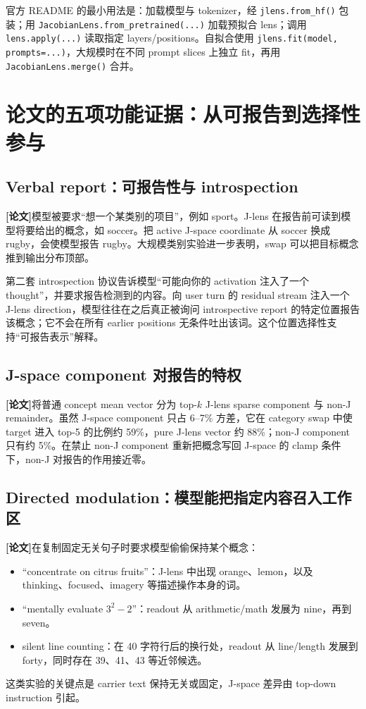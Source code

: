 \documentclass[10.5pt,a4paper]{ctexart}
\newcommand{\Paper}{\textbf{[论文]}}
\begin{document}
\begin{codeclaim}
官方 README 的最小用法是：加载模型与 tokenizer，经 \texttt{jlens.from\_hf()} 包装；用 \texttt{JacobianLens.from\_pretrained(...)} 加载预拟合 lens；调用 \texttt{lens.apply(...)} 读取指定 layers/positions。自拟合使用 \texttt{jlens.fit(model, prompts=...)}，大规模时在不同 prompt slices 上独立 fit，再用 \texttt{JacobianLens.merge()} 合并。
\end{codeclaim}

\section{论文的五项功能证据：从可报告到选择性参与}

\subsection{Verbal report：可报告性与 introspection}
\Paper 模型被要求“想一个某类别的项目”，例如 sport。J-lens 在报告前可读到模型将要给出的概念，如 soccer。把 active J-space coordinate 从 soccer 换成 rugby，会使模型报告 rugby。大规模类别实验进一步表明，swap 可以把目标概念推到输出分布顶部。

第二套 introspection 协议告诉模型“可能向你的 activation 注入了一个 thought”，并要求报告检测到的内容。向 user turn 的 residual stream 注入一个 J-lens direction，模型往往在之后真正被询问 introspective report 的特定位置报告该概念；它不会在所有 earlier positions 无条件吐出该词。这个位置选择性支持“可报告表示”解释。

\subsection{J-space component 对报告的特权}
\Paper 将普通 concept mean vector 分为 top-$k$ J-lens sparse component 与 non-J remainder。虽然 J-space component 只占 6--7\% 方差，它在 category swap 中使 target 进入 top-5 的比例约 59\%，pure J-lens vector 约 88\%；non-J component 只有约 5\%。在禁止 non-J component 重新把概念写回 J-space 的 clamp 条件下，non-J 对报告的作用接近零。

\subsection{Directed modulation：模型能把指定内容召入工作区}
\Paper 在复制固定无关句子时要求模型偷偷保持某个概念：
\begin{itemize}
\item “concentrate on citrus fruits”：J-lens 中出现 orange、lemon，以及 thinking、focused、imagery 等描述操作本身的词。
\item “mentally evaluate $3^2-2$”：readout 从 arithmetic/math 发展为 nine，再到 seven。
\item silent line counting：在 40 字符行后的换行处，readout 从 line/length 发展到 forty，同时存在 39、41、43 等近邻候选。
\end{itemize}
这类实验的关键点是 carrier text 保持无关或固定，J-space 差异由 top-down instruction 引起。
\end{document}
